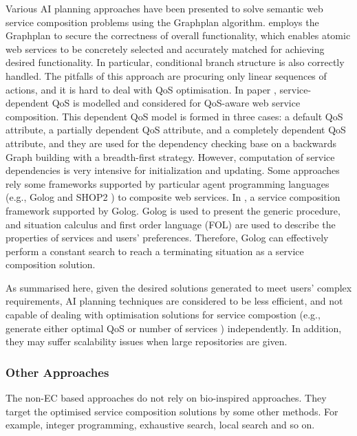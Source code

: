 Various AI planning approaches \cite{feng2013dynamic,huang2009effective,rao2006mixed,wang2013genetic, wang2014automated} have been presented to solve semantic web service composition problems using the Graphplan \cite{blum1997fast} algorithm. \cite{wang2014automated} employs the Graphplan to secure the correctness of overall functionality, which enables atomic web services to be concretely selected and accurately matched for achieving desired functionality. In particular, conditional branch structure is also correctly handled. The pitfalls of this approach are procuring only linear sequences of actions, and it is hard to deal with QoS optimisation. In paper \cite{feng2013dynamic}, service-dependent QoS is modelled and considered for QoS-aware web service composition. This dependent QoS model is formed in three cases: a default QoS attribute, a partially dependent QoS attribute, and a completely dependent QoS attribute, and they are used for the dependency checking base on a backwards Graph building with a breadth-first strategy. However, computation of service dependencies is very intensive for initialization and updating. Some approaches \cite{lecue2007making,sohrabi2009web} rely some frameworks supported by particular agent programming languages (e.g., Golog \cite{sohrabi2009web}  and SHOP2 \cite{sirin2004htn}) to composite web services. In \cite{sohrabi2009web}, a service composition framework supported by Golog. Golog is used to present the generic procedure, and situation calculus and first order language (FOL) are used to describe the properties of services and users' preferences. Therefore, Golog can effectively perform a constant search to reach a terminating situation as a service composition solution.

As summarised here, given the desired solutions generated to meet users' complex requirements, AI planning techniques are considered to be less efficient, and not capable of dealing with optimisation solutions for service compostion (e.g., generate either optimal QoS or number of services ) independently. In addition, they may suffer scalability issues when large repositories are given. 

\subsubsection{Other Approaches}
The non-EC based approaches do not rely on bio-inspired approaches. They target the optimised service composition solutions by some other methods. For example, integer programming, exhaustive search, local search and so on.

